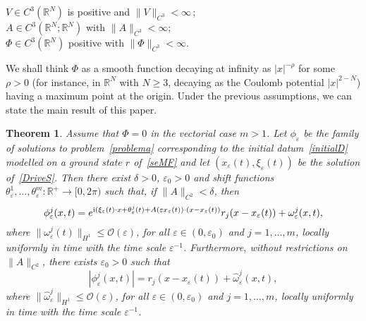 \documentclass[11pt]{amsart}
\numberwithin{equation}{section}
\newtheorem{theorem}{Theorem}[section]
\theoremstyle{definition}
\begin{document}
 $V\in C^3({{\mathbb R}}^N)$ is positive and
$\|V\|_{C^3}<\infty$\,;\\

 $A\in C^3({{\mathbb R}}^N;{{\mathbb R}}^N)$ with $\|A\|_{C^3}<\infty$;\\

\noindent {\bf ($\boldsymbol{\Phi}$)} $\Phi\in C^3({{\mathbb R}}^N)$ positive with $\|\Phi\|_{C^3}<\infty$.

\vskip8pt
\noindent
We shall think $\Phi$ as a smooth function decaying at infinity as $|x|^{-\rho}$ for some $\rho>0$
(for instance, in ${{\mathbb R}}^N$ with $N\geq 3$, decaying as the Coulomb potential $|x|^{2-N}$)
having a maximum point at the origin.
\vskip8pt
\noindent
Under the previous assumptions, we can state the main result of this paper.

\begin{theorem}\label{th:main}
    Assume that $\Phi=0$ in the vectorial case $m>1$.
    Let $\phi_{\varepsilon}$ be the family of solutions to problem~\eqref{problema} corresponding to the initial datum~\eqref{initialD}
    modelled on a ground state $r$ of~\eqref{seMF} and let $(x_{\varepsilon}(t), \xi_{\varepsilon}(t))$ be the solution
    of~\eqref{DriveS}. Then there exist $\delta>0$, ${\varepsilon}_0>0$ and shift functions $\theta^1_{\varepsilon}, \dots,
\theta^m_{\varepsilon} :{{\mathbb R}}^+\to[0,2\pi)$ such that, if $\|A\|_{C^2}<\delta$, then
\begin{equation*}
    \phi_{\varepsilon}^j(x,t)=e^{{{\rm i}}(\xi_{\varepsilon}(t)\cdot x+\theta^j_{\varepsilon}(t)+A({\varepsilon} x_{\varepsilon}(t))
    \cdot (x-x_{\varepsilon}(t))}r_j(x-x_{\varepsilon}(t))+\omega^j_{\varepsilon}(x,t),
\end{equation*}
where $\|\omega^j_{\varepsilon}(t)\|_{H^1}\leq {\mathcal O}({\varepsilon})$,
for all ${\varepsilon}\in(0,{\varepsilon}_{0})$ and $j=1,\dots, m$, locally uniformly in time with the time scale ${\varepsilon}^{-1}$.
Furthermore, without restrictions on $\|A\|_{C^2}$, there exists ${\varepsilon}_0>0$ such that
\begin{equation}
	\label{secondconcl-A}
	|\phi_{\varepsilon}^j(x,t)|=r_j(x-x_{\varepsilon}(t))+\hat\omega_{\varepsilon}^j(x,t),
\end{equation}
where $\|\hat\omega_{\varepsilon}^j\|_{H^1}\leq {\mathcal O}({\varepsilon})$,
for all ${\varepsilon}\in(0,{\varepsilon}_{0})$ and $j=1,\dots, m$, locally uniformly in time
with the time scale ${\varepsilon}^{-1}$.
\end{theorem}
\vskip1pt
\end{document}

